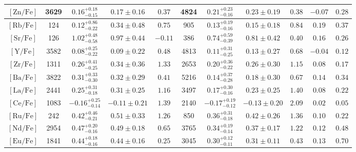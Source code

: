\begin{table*}
\begin{tabular}{c|cccc|cccc|cc}
$\mathrm{[Zn/Fe]}$ & 3629 & $0.16_{-0.15}^{+0.18}$ & $0.17 \pm 0.16$ & $0.37$ & 4824 & $0.21_{-0.16}^{+0.23}$ & $0.23 \pm 0.19$ & $0.38$ & $-0.07$ & $0.28$  \\
\hline
$\mathrm{[Rb/Fe]}$ & 124 & $0.12_{-0.22}^{+0.86}$ & $0.34 \pm 0.48$ & $0.75$ & 905 & $0.13_{-0.16}^{+0.19}$ & $0.15 \pm 0.18$ & $0.84$ & $0.19$ & $0.37$  \\
$\mathrm{[Sr/Fe]}$ & 126 & $1.02_{-0.58}^{+0.48}$ & $0.97 \pm 0.44$ & $-0.11$ & 386 & $0.74_{-0.39}^{+0.59}$ & $0.81 \pm 0.42$ & $0.40$ & $0.16$ & $0.26$  \\
$\mathrm{[Y/Fe]}$ & 3582 & $0.08_{-0.22}^{+0.25}$ & $0.09 \pm 0.22$ & $0.48$ & 4813 & $0.11_{-0.25}^{+0.31}$ & $0.13 \pm 0.27$ & $0.68$ & $-0.04$ & $0.12$  \\
$\mathrm{[Zr/Fe]}$ & 1311 & $0.26_{-0.25}^{+0.41}$ & $0.34 \pm 0.36$ & $1.33$ & 2653 & $0.20_{-0.22}^{+0.36}$ & $0.26 \pm 0.30$ & $1.15$ & $0.08$ & $0.17$  \\
$\mathrm{[Ba/Fe]}$ & 3822 & $0.31_{-0.30}^{+0.33}$ & $0.32 \pm 0.29$ & $0.41$ & 5216 & $0.14_{-0.28}^{+0.37}$ & $0.18 \pm 0.30$ & $0.67$ & $0.14$ & $0.34$  \\
$\mathrm{[La/Fe]}$ & 2441 & $0.25_{-0.18}^{+0.31}$ & $0.31 \pm 0.25$ & $1.16$ & 3497 & $0.17_{-0.16}^{+0.30}$ & $0.23 \pm 0.25$ & $1.40$ & $0.08$ & $0.22$  \\
$\mathrm{[Ce/Fe]}$ & 1083 & $-0.16_{-0.14}^{+0.25}$ & $-0.11 \pm 0.21$ & $1.39$ & 2140 & $-0.17_{-0.12}^{+0.19}$ & $-0.13 \pm 0.20$ & $2.09$ & $0.02$ & $0.05$  \\
\hline
$\mathrm{[Ru/Fe]}$ & 242 & $0.42_{-0.21}^{+0.46}$ & $0.51 \pm 0.33$ & $1.26$ & 850 & $0.36_{-0.18}^{+0.31}$ & $0.42 \pm 0.26$ & $1.36$ & $0.10$ & $0.22$  \\
$\mathrm{[Nd/Fe]}$ & 2954 & $0.47_{-0.16}^{+0.20}$ & $0.49 \pm 0.18$ & $0.65$ & 3765 & $0.34_{-0.14}^{+0.19}$ & $0.37 \pm 0.17$ & $1.22$ & $0.12$ & $0.48$  \\
$\mathrm{[Eu/Fe]}$ & 1841 & $0.44_{-0.16}^{+0.18}$ & $0.44 \pm 0.16$ & $0.25$ & 3045 & $0.30_{-0.11}^{+0.12}$ & $0.31 \pm 0.11$ & $0.43$ & $0.13$ & $0.70$  \\
\hline
\end{tabular}
\end{table*}
\endgroup
